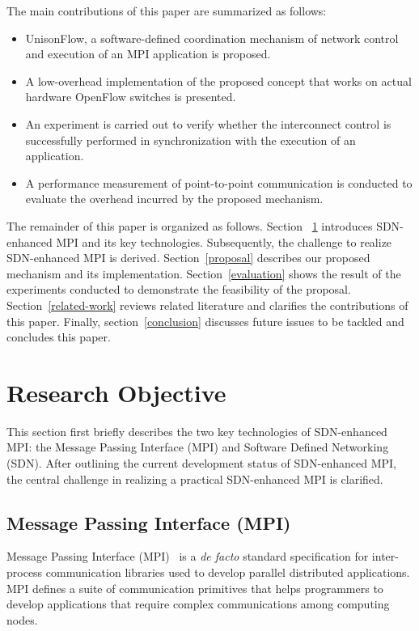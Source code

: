 The main contributions of this paper are summarized as follows:

\begin{itemize}
\item
  UnisonFlow, a software-defined coordination mechanism of network
  control and execution of an MPI application is proposed.
\item
  A low-overhead implementation of the proposed concept that works on
  actual hardware OpenFlow switches is presented.
\item
  An experiment is carried out to verify whether the interconnect
  control is successfully performed in synchronization with the
  execution of an application.
\item
  A performance measurement of point-to-point communication is conducted
  to evaluate the overhead incurred by the proposed mechanism.
\end{itemize}

The remainder of this paper is organized as follows. Section
~\ref{research-objective} introduces SDN-enhanced MPI and its key
technologies. Subsequently, the challenge to realize SDN-enhanced MPI is
derived. Section~\ref{proposal} describes our proposed mechanism and its
implementation. Section~\ref{evaluation} shows the result of the
experiments conducted to demonstrate the feasibility of the proposal.
Section~\ref{related-work} reviews related literature and clarifies the
contributions of this paper. Finally, section~\ref{conclusion} discusses
future issues to be tackled and concludes this paper.

\hypertarget{research-objective}{%
\section{Research Objective}\label{research-objective}}

This section first briefly describes the two key technologies of
SDN-enhanced MPI: the Message Passing Interface (MPI) and Software
Defined Networking (SDN). After outlining the current development status
of SDN-enhanced MPI, the central challenge in realizing a practical
SDN-enhanced MPI is clarified.

\hypertarget{message-passing-interface-mpi}{%
\subsection{Message Passing Interface
(MPI)}\label{message-passing-interface-mpi}}

Message Passing Interface (MPI)~\autocite{MPIForum2012} is a \emph{de
facto} standard specification for inter-process communication libraries
used to develop parallel distributed applications. MPI defines a suite
of communication primitives that helps programmers to develop
applications that require complex communications among computing nodes.

